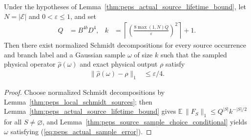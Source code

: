 \begin{lemma}
    \label{thm:peps_actual_source_sampling}
    \leanok
    Under the hypotheses of Lemma~\ref{thm:peps_actual_source_lifetime_bound},
    let $N=|\mathcal E|$ and $0<\varepsilon\leq1$, and set
    \begin{align}
        Q & = B^{4b}D^4,
          & k            & = \left\lceil
        \left(\frac{8\max(1,N)Q}{\varepsilon}\right)^2
        \right\rceil+1.
        \label{eq:peps_actual_sample_count}
    \end{align}
    Then there exist normalized Schmidt decompositions for every source
    occurrence and branch label and a Gaussian sample $\omega$ of size $k$ such
    that the sampled physical operator $\widehat\rho(\omega)$ and exact physical
    output $\rho$ satisfy
    \begin{align}
        \|\widehat\rho(\omega)-\rho\|_1 & \leq \varepsilon/4.
        \label{eq:peps_actual_sample_error}
    \end{align}
\end{lemma}
\begin{proof}
    \leanok
    Choose normalized Schmidt decompositions by
    Lemma~\ref{thm:peps_local_schmidt_sources}; then
    Lemma~\ref{thm:peps_actual_source_lifetime_bound} gives
    $\mathbb E\,\|F_S\|_1\leq Q^{|S|}k^{-|S|/2}$ for all $S\neq\varnothing$, and
    Lemma~\ref{thm:peps_source_sample_choice_conditional} yields $\omega$
    satisfying (\ref{eq:peps_actual_sample_error}).
\end{proof}

